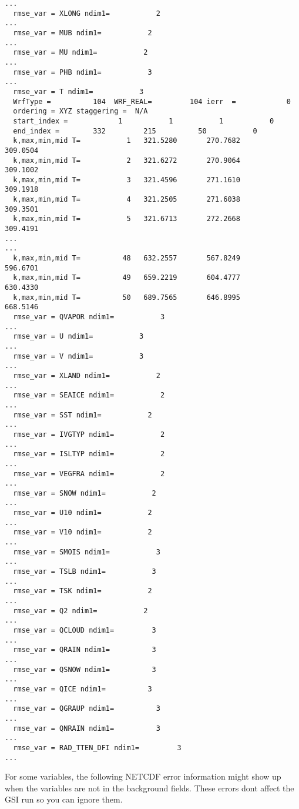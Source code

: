 \begin{scriptsize}
\begin{verbatim}
...
  rmse_var = XLONG ndim1=           2
...
  rmse_var = MUB ndim1=           2
...
  rmse_var = MU ndim1=           2
...
  rmse_var = PHB ndim1=           3
...
  rmse_var = T ndim1=           3
  WrfType =          104  WRF_REAL=         104 ierr  =            0
  ordering = XYZ staggering =  N/A
  start_index =            1           1           1           0  
  end_index =        332         215          50           0
  k,max,min,mid T=           1   321.5280       270.7682       309.0504
  k,max,min,mid T=           2   321.6272       270.9064       309.1002
  k,max,min,mid T=           3   321.4596       271.1610       309.1918
  k,max,min,mid T=           4   321.2505       271.6038       309.3501
  k,max,min,mid T=           5   321.6713       272.2668       309.4191
...
...
  k,max,min,mid T=          48   632.2557       567.8249       596.6701
  k,max,min,mid T=          49   659.2219       604.4777       630.4330
  k,max,min,mid T=          50   689.7565       646.8995       668.5146
  rmse_var = QVAPOR ndim1=           3
...
  rmse_var = U ndim1=           3
...
  rmse_var = V ndim1=           3
...
  rmse_var = XLAND ndim1=           2
...
  rmse_var = SEAICE ndim1=           2
...
  rmse_var = SST ndim1=           2
...
  rmse_var = IVGTYP ndim1=           2
...
  rmse_var = ISLTYP ndim1=           2
...
  rmse_var = VEGFRA ndim1=           2
...
  rmse_var = SNOW ndim1=           2
...
  rmse_var = U10 ndim1=           2
...
  rmse_var = V10 ndim1=           2
...
  rmse_var = SMOIS ndim1=           3
...
  rmse_var = TSLB ndim1=           3
...
  rmse_var = TSK ndim1=           2
...
  rmse_var = Q2 ndim1=           2
...
  rmse_var = QCLOUD ndim1=         3
...
  rmse_var = QRAIN ndim1=          3
...
  rmse_var = QSNOW ndim1=          3
...
  rmse_var = QICE ndim1=          3
...
  rmse_var = QGRAUP ndim1=          3
...
  rmse_var = QNRAIN ndim1=          3
...
  rmse_var = RAD_TTEN_DFI ndim1=         3
...
\end{verbatim}
\end{scriptsize}

For some variables, the following NETCDF error information might show up when the variables are not in the background fields. These errors don\textquotesingle t affect the GSI run so you can ignore them.

